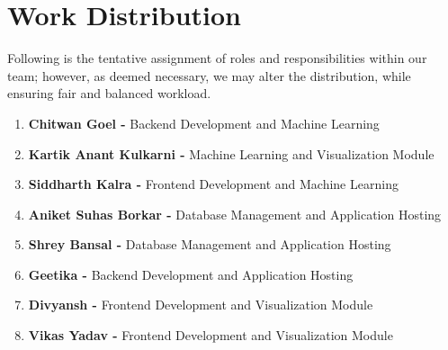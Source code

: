 \documentclass[11pt]{article}
\begin{document}
\section{Work Distribution}
Following is the tentative assignment of roles and responsibilities within our team; however, as deemed necessary, we may alter the distribution, while ensuring fair and balanced workload.

\begin{enumerate}
    \item \textbf{Chitwan Goel - }Backend Development and Machine Learning
    \item \textbf{Kartik Anant Kulkarni - }Machine Learning and Visualization Module
    \item \textbf{Siddharth Kalra - }Frontend Development and Machine Learning
    \item \textbf{Aniket Suhas Borkar - }Database Management and Application Hosting
    \item \textbf{Shrey Bansal - }Database Management and Application Hosting
    \item \textbf{Geetika - }Backend Development and Application Hosting
    \item \textbf{Divyansh - }Frontend Development and Visualization Module
    \item \textbf{Vikas Yadav - }Frontend Development and Visualization Module
\end{enumerate}
\end{document}
